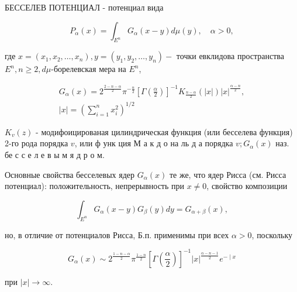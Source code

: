\documentclass[10pt]{article}
\begin{document}
БЕССЕЛЕВ ПОТЕНЦИАЛ - потенциал вида



\[

P_{\alpha}(x)=\int_{E^{n}} G_{\alpha}(x-y) d \mu(y), \quad \alpha>0,

\]



где $x=\left(x_{1}, x_{2}, \ldots, x_{n}\right), y=\left(y_{1}, y_{2}, \ldots, y_{n}\right)-$ точки евклидова пространства $E^{n}, n \geqslant 2, d \mu$-борелевская мера на $E^{n}$,



\[

\begin{gathered}

G_{\alpha}(x)=2^{\frac{2-n-\alpha}{2}} \pi^{-\frac{n}{2}}\left[\Gamma\left(\frac{\alpha}{2}\right)\right]^{-1} K_{\frac{n-\alpha}{2}}(|x|)|x|^{\frac{\alpha-n}{2}}, \\

|x|=\left(\sum_{i=1}^{n} x_{i}^{2}\right)^{1 / 2}

\end{gathered}

\]



$K_{v}(z)$ - модифоицированая цилиндрическая функция (или бесселева функция) 2-го рода порядка $v$, или ф унк ция М а к д о на ль д а порядка $v ; G_{\alpha}(x)$ наз. бе с с е л е в ы м я д р о м.



Основные свойства бесселевых ядер $G_{\alpha}(x)$ те же, что ядер Рисса (см. Рисса потенциал): положительность, непрерывность при $x \neq 0$, свойство композиции



\[

\int_{E^{n}} G_{\alpha}(x-y) G_{\beta}(y) d y=G_{\alpha+\beta}(x),

\]



но, в отличие от потенциалов Рисса, Б.п. применимы при всех $\alpha>0$, поскольку



\[

G_{\alpha}(x) \sim 2^{\frac{1-n-\alpha}{2}} \pi^{\frac{1-n}{2}}\left[\Gamma\left(\frac{\alpha}{2}\right)\right]^{-1}|x|^{\frac{\alpha-n-1}{2}} e^{-\mid x}

\]



при $|x| \rightarrow \infty$.
\end{document}
